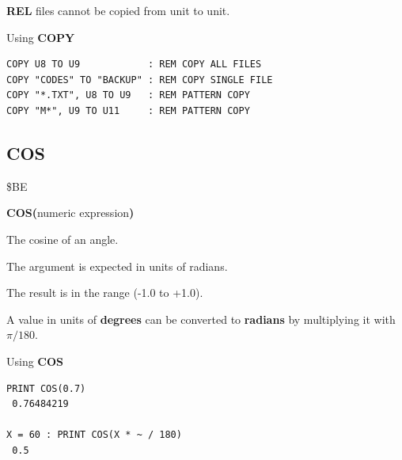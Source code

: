 \begin{description}[leftmargin=2cm,style=nextline]
                  {\bf REL} files cannot be copied from unit to unit.

\item [Examples:] Using {\bf COPY}

\begin{tcolorbox}[colback=black,coltext=white]
\verbatimfont{\codefont}
\begin{verbatim}
COPY U8 TO U9            : REM COPY ALL FILES
COPY "CODES" TO "BACKUP" : REM COPY SINGLE FILE
COPY "*.TXT", U8 TO U9   : REM PATTERN COPY
COPY "M*", U9 TO U11     : REM PATTERN COPY
\end{verbatim}
\end{tcolorbox}
\end{description}


\newpage
\subsection{COS}
\begin{description}[leftmargin=2cm,style=nextline]
\item [Token:]    \$BE

\item [Format:]   {\bf COS(}numeric expression{\bf )}

\item [Returns:]  The cosine of an angle.

                  The argument is expected in units of radians.

                  The result is in the range (-1.0 to +1.0).

\item [Remarks:]  A value in units of {\bf degrees} can be converted to {\bf radians} by multiplying it with $\pi/180$.

\item [Examples:] Using {\bf COS}

\begin{tcolorbox}[colback=black,coltext=white]
\verbatimfont{\codefont}
\begin{verbatim}
PRINT COS(0.7)
 0.76484219

X = 60 : PRINT COS(X * ~ / 180)
 0.5
\end{verbatim}
\end{tcolorbox}
\end{description}


\newpage
